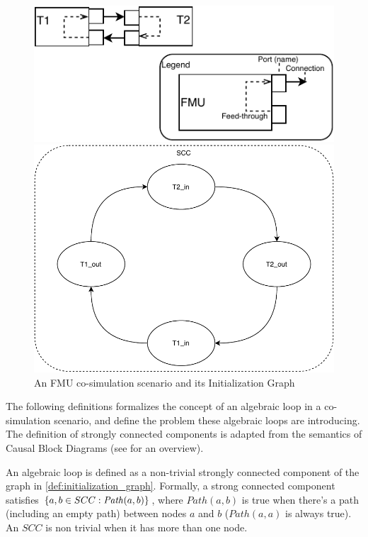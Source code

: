 \begin{figure}
    \centering
    \begin{minipage}{0.55\textwidth}
        \centering
    \includegraphics[width=1\textwidth]{images/fmu_cycle.pdf}
    \end{minipage}\hfill
    \begin{minipage}{0.35\textwidth}
        \centering
    \includegraphics[width=1\textwidth]{images/SCC.pdf}
    \end{minipage}
    \caption{An FMU co-simulation scenario and its Initialization Graph}
    \label{fig:fmu_cycle}
\end{figure}


The following definitions formalizes the concept of an algebraic loop in a co-simulation scenario, and define the problem these algebraic loops are introducing.
The definition of strongly connected components is adapted from the semantics of Causal Block Diagrams (see \cite{Gomes2020} for an overview).

\begin{definition} \label{def:loop}
An algebraic loop is defined as a non-trivial strongly connected component of the graph in \cref{def:initialization_graph}.
Formally, a strong connected component satisfies $ \left\{ a,b \in SCC: \mathit{Path}(a,b) \right\}$, where $\mathit{Path}(a,b)$ is true when there's a path (including an empty path) between nodes $a$ and $b$ ($\mathit{Path}(a,a)$ is always true).
An $SCC$ is non trivial when it has more than one node.
\end{definition}

